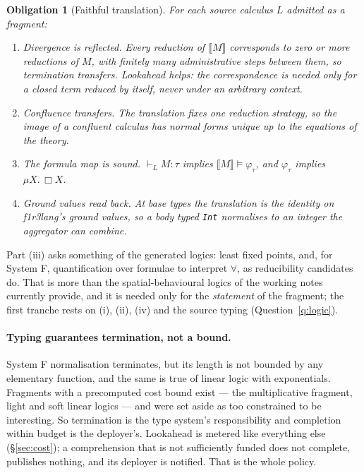 \documentclass[11pt]{article}
\theoremstyle{branddef}
\newtheorem{obligation}[definition]{Obligation}
\theoremstyle{brandplain}
\theoremstyle{brandrem}
\newcommand{\sem}[1]{\llbracket #1 \rrbracket}
\newcommand{\flang}{\textsf{f1r3lang}}
\begin{document}
\begin{obligation}[Faithful translation]
\label{obl:fragment}
For each source calculus \(L\) admitted as a fragment:
\begin{enumerate}[nosep,label=(\roman*)]
\item \emph{Divergence is reflected.} Every reduction of \(\sem{M}\) corresponds
to zero or more reductions of \(M\), with finitely many administrative steps
between them, so termination transfers. Lookahead helps: the correspondence is
needed only for a closed term reduced by itself, never under an arbitrary
context.
\item \emph{Confluence transfers.} The translation fixes one reduction strategy,
so the image of a confluent calculus has normal forms unique up to the
equations of the theory.
\item \emph{The formula map is sound.} \(\vdash_L M : \tau\) implies
\(\sem{M} \models \varphi_\tau\), and \(\varphi_\tau\) implies
\(\mu X.\,\Box X\).
\item \emph{Ground values read back.} At base types the translation is the
identity on \flang{}'s ground values, so a body typed \texttt{Int} normalises to
an integer the aggregator can combine.
\end{enumerate}
\end{obligation}

\noindent
Part (iii) asks something of the generated logics: least fixed points, and,
for System F, quantification over formulae to interpret \(\forall\), as
reducibility candidates do. That is more than the spatial-behavioural logics of
the working notes currently provide, and it is needed only for the
\emph{statement} of the fragment; the first tranche rests on (i), (ii), (iv)
and the source typing (Question~\ref{q:logic}).

\paragraph{Typing guarantees termination, not a bound.} System F normalisation
terminates, but its length is not bounded by any elementary function, and the
same is true of linear logic with exponentials. Fragments with a precomputed
cost bound exist --- the multiplicative fragment, light and soft linear logics
--- and were set aside as too constrained to be interesting. So termination is
the type system's responsibility and completion within budget is the
deployer's. Lookahead is metered like everything else (\S\ref{sec:cost}); a
comprehension that is not sufficiently funded does not complete, publishes
nothing, and its deployer is notified. That is the whole policy.
\end{document}
